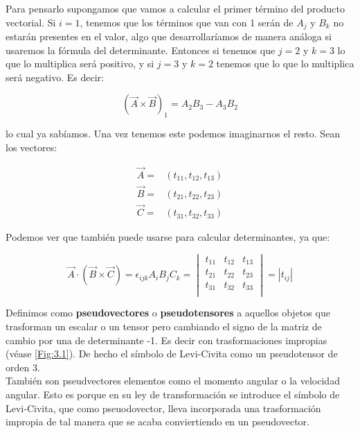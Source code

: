 \documentclass[12pt,a4paper]{book}
\begin{document}
Para pensarlo supongamos que vamos a calcular el primer término del producto vectorial. Si $i=1$, tenemos que los términos que van con 1 serán de $A_j$ y $B_k$ no estarán presentes en el valor, algo que desarrollaríamos de manera análoga si usaremos la fórmula del determinante. Entonces si tenemos que $j=2$ y $k=3$ lo que lo multiplica será positivo, y si $j=3$ y $k=2$ tenemos que lo que lo multiplica será negativo. Es decir:

$$ (\vec{A} \times \vec{B})_1 = A_2 B_3 - A_3 B_2 $$

lo cual ya sabíamos. Una vez tenemos este podemos imaginarnos el resto. Sean los vectores:

\begin{equation}
\begin{array}{ll}
\vec{A} = &  (t_{1 1}, t_{1 2}, t_{1 3}) \\
\vec{B} = &   (t_{2 1}, t_{2 2}, t_{2 3}) \\
\vec{C} = &  (t_{3 1}, t_{3 2}, t_{3 3})

\end{array}
\end{equation}

Podemos ver que también puede usarse para calcular determinantes, ya que:

\begin{equation}
\vec{A} \cdot (\vec{B} \times \vec{C}) = \epsilon_{ijk} A_i B_j C_k  = \begin{vmatrix}
t_{1 1} &
t_{1 2} &
t_{1 3} \\ 
t_{2 1} &
t_{2 2} &
t_{2 3} \\ 
t_{3 1} &
t_{3 2} &
t_{3 3} \\ 

\end{vmatrix} = |t_{ij}|
\end{equation}

Definimos como \textbf{pseudovectores} o \textbf{pseudotensores} a aquellos objetos que trasforman un escalar o un tensor pero cambiando el signo de la matriz de cambio por una de determinante -1. Es decir con trasformaciones impropias (véase \ref{Fig:3.1}). De hecho el símbolo de Levi-Civita como un pseudotensor de orden 3. \\

También son pseudvectores elementos como el momento angular o la velocidad angular. Esto es porque en su ley de transformación se introduce el símbolo de Levi-Civita, que como pseuodovector, lleva incorporada una trasformación impropia de tal manera que se acaba conviertiendo en un pseudovector. 
\end{document}
